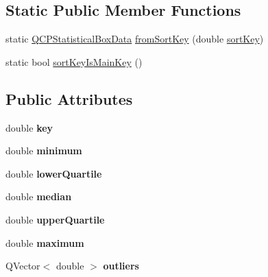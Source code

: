 \subsection*{Static Public Member Functions}
\begin{DoxyCompactItemize}
\item 
static \hyperlink{classQCPStatisticalBoxData}{Q\+C\+P\+Statistical\+Box\+Data} \hyperlink{classQCPStatisticalBoxData_a8c391d5a6c7cebc79b664aad9917b499}{from\+Sort\+Key} (double \hyperlink{classQCPStatisticalBoxData_ad00ab8d43ec89a40ec7ee7ca154a2b0e}{sort\+Key})
\item 
static bool \hyperlink{classQCPStatisticalBoxData_a4710ae44b85d4b34b13c3f9301f28c01}{sort\+Key\+Is\+Main\+Key} ()
\end{DoxyCompactItemize}
\subsection*{Public Attributes}
\begin{DoxyCompactItemize}
\item 
double {\bfseries key}\hypertarget{classQCPStatisticalBoxData_a2d0b5ca5130e8a73294c46b8b2fd77b8}{}\label{classQCPStatisticalBoxData_a2d0b5ca5130e8a73294c46b8b2fd77b8}

\item 
double {\bfseries minimum}\hypertarget{classQCPStatisticalBoxData_adc2f4b8cbff9f2e4a676f32bad8a7e3a}{}\label{classQCPStatisticalBoxData_adc2f4b8cbff9f2e4a676f32bad8a7e3a}

\item 
double {\bfseries lower\+Quartile}\hypertarget{classQCPStatisticalBoxData_af9f478b4ea0789fa6cff7eebb654b5d4}{}\label{classQCPStatisticalBoxData_af9f478b4ea0789fa6cff7eebb654b5d4}

\item 
double {\bfseries median}\hypertarget{classQCPStatisticalBoxData_a116cd53ae6685979ec3b051cfc7dbba5}{}\label{classQCPStatisticalBoxData_a116cd53ae6685979ec3b051cfc7dbba5}

\item 
double {\bfseries upper\+Quartile}\hypertarget{classQCPStatisticalBoxData_a5604dfe04b103e5ac73ce7895b46303b}{}\label{classQCPStatisticalBoxData_a5604dfe04b103e5ac73ce7895b46303b}

\item 
double {\bfseries maximum}\hypertarget{classQCPStatisticalBoxData_aa2800abda337decfc4277cb8bf846d6f}{}\label{classQCPStatisticalBoxData_aa2800abda337decfc4277cb8bf846d6f}

\item 
Q\+Vector$<$ double $>$ {\bfseries outliers}\hypertarget{classQCPStatisticalBoxData_abaa27539fbd941d3f1eb8169e881e308}{}\label{classQCPStatisticalBoxData_abaa27539fbd941d3f1eb8169e881e308}

\end{DoxyCompactItemize}


